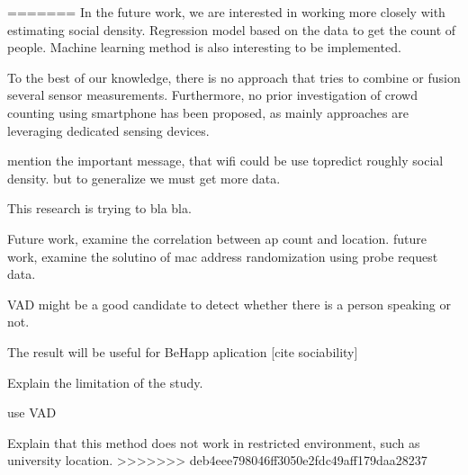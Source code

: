 

=======
In the future work, we are interested in working more closely with estimating social density. Regression model based on the data to get the count of people. Machine learning method is also interesting to be implemented.

To the best of our knowledge, there is no approach that tries to combine or fusion several sensor measurements. Furthermore, no prior investigation of crowd counting using smartphone has been proposed, as mainly approaches are leveraging dedicated sensing devices.

mention the important message, that wifi could be use topredict roughly social density. but to generalize we must get more data.

This research is trying to bla bla.

Future work, examine the correlation between ap count and location.
future work, examine the solutino of mac address randomization using probe request data.

VAD might be a good candidate to detect whether there is a person speaking or not.

The result will be useful for BeHapp aplication [cite sociability]

Explain the limitation of the study.

use VAD

Explain that this method does not work in restricted environment, such as university location.
>>>>>>> deb4eee798046ff3050e2fdc49aff179daa28237

